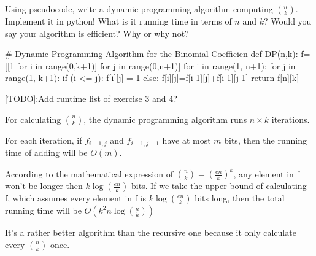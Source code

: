 \documentclass[11pt,a4paper,oneside]{article}
\begin{document}
\begin{problem}{4}
    Using pseudocode, write a dynamic programming algorithm
    computing ${n \choose k}$. Implement it in python! What is it running time
    in terms of $n$ and $k$?
    Would you say your algorithm is efficient? Why or why not?
    \solution
\begin{python}
# Dynamic Programming Algorithm for the Binomial Coefficien
def DP(n,k):
	f=[[1 for i in range(0,k+1)] for j in range(0,n+1)]
	for i in range(1, n+1):
    	for j in range(1, k+1):
    		if (i <= j):
    			f[i][j] = 1
    		else:
    			f[i][j]=f[i-1][j]+f[i-1][j-1]
	return f[n][k]
\end{python}
    
    [TODO]:Add runtime list of exercise 3 and 4?
    
	For calculating ${n \choose k}$, the dynamic programming algorithm runs $n \times k$ iterations.
	
	For each iteration, if $f_{i-1,j}$ and $f_{i-1,j-1}$ have at most $m$ bits, then the running time of adding will be $O(m)$.
    
    According to the mathematical expression of ${n \choose k}=(\frac{en}{k})^k$, any element in f won't be longer then $k\log(\frac{en}{k})$ bits. If we take the upper bound of calculating f, which assumes every element in f is $k\log(\frac{en}{k})$ bits long, then the total running time will be $O(k^2n\log(\frac{n}{k}))$
    
    It's a rather better algorithm than the recursive one because it only calculate every ${n \choose k}$ once.

\end{problem}
\end{document}

